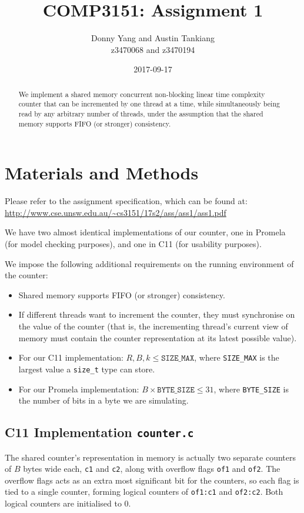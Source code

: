 \documentclass[a4paper]{scrartcl}
\begin{document}
\title{COMP3151: Assignment 1}
\author{Donny Yang and Austin Tankiang \\ z3470068 and z3470194}
\date{2017-09-17}
\maketitle

\begin{abstract}
    We implement a shared memory concurrent non-blocking linear time complexity counter that can be incremented by one thread at a time, while simultaneously being read by any arbitrary number of threads, under the assumption that the shared memory supports FIFO (or stronger) consistency.
\end{abstract}

\section{Materials and Methods}
Please refer to the assignment specification, which can be found at: \url{http://www.cse.unsw.edu.au/~cs3151/17s2/ass/ass1/ass1.pdf}

We have two almost identical implementations of our counter, one in Promela (for model checking purposes), and one in C11 (for usability purposes).

We impose the following additional requirements on the running environment of the counter:
\begin{itemize}
    \item Shared memory supports FIFO (or stronger) consistency.
    \item If different threads want to increment the counter, they must synchronise on the value of the counter (that is, the incrementing thread's current view of memory must contain the counter representation at its latest possible value).
    \item For our C11 implementation: \(R, B, k \le \texttt{SIZE\_MAX}\), where \texttt{SIZE\_MAX} is the largest value a \texttt{size\_t} type can store.
    \item For our Promela implementation: \(B \times \texttt{BYTE\_SIZE} \le 31\), where \texttt{BYTE\_SIZE} is the number of bits in a byte we are simulating.
\end{itemize}

\subsection{C11 Implementation \texttt{counter.c}}
The shared counter's representation in memory is actually two separate counters of \(B\) bytes wide each, \texttt{c1} and \texttt{c2}, along with overflow flags \texttt{of1} and \texttt{of2}. The overflow flags acts as an extra most significant bit for the counters, so each flag is tied to a single counter, forming logical counters of \texttt{of1:c1} and \texttt{of2:c2}. Both logical counters are initialised to 0.
\end{document}
